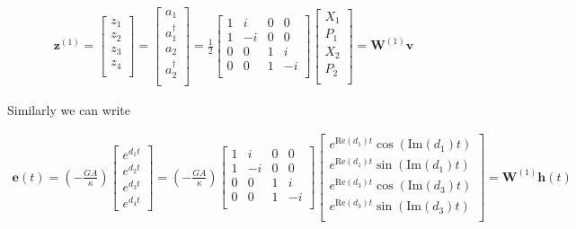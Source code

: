\documentclass[12pt]{article}
\newcommand{\bv}[1]{\boldsymbol{#1}}
\begin{document}
\begin{align}
\bv{z}^{(1)} = 
\begin{bmatrix}
z_1\\
z_2\\
z_3\\
z_4\\
\end{bmatrix}
=
\begin{bmatrix}
a_1\\
a_1^{\dag}\\
a_2\\
a_2^{\dag}\\
\end{bmatrix}
=
\frac{1}{2}
\begin{bmatrix}
1 & i & 0 & 0\\
1 & -i & 0 & 0\\
0 & 0 & 1 & i\\
0 & 0 & 1 & -i\\
\end{bmatrix}
\begin{bmatrix}
X_1\\
P_1\\
X_2\\
P_2\\
\end{bmatrix}
=
\bv{W}^{(1)}\bv{v}
\end{align}

Similarly we can write

\begin{align}
\bv{e}(t) =
\left(-\frac{GA}{\kappa}\right)
\begin{bmatrix}
e^{d_1 t}\\
e^{d_2 t}\\
e^{d_3 t}\\
e^{d_4 t}
\end{bmatrix}
=
\left(-\frac{GA}{\kappa}\right)
\begin{bmatrix}
1 & i & 0 & 0\\
1 & -i & 0 & 0\\
0 & 0 & 1 & i\\
0 & 0 & 1 & -i\\
\end{bmatrix}
\begin{bmatrix}
e^{\text{Re}(d_1) t} \cos\left(\text{Im}(d_1) t\right)\\
e^{\text{Re}(d_1) t} \sin\left(\text{Im}(d_1) t\right)\\
e^{\text{Re}(d_3) t} \cos\left(\text{Im}(d_3) t\right)\\
e^{\text{Re}(d_3) t} \sin\left(\text{Im}(d_3) t\right)\\
\end{bmatrix}
= \bv{W}^{(1)} \bv{h}(t)
\end{align}
\end{document}
